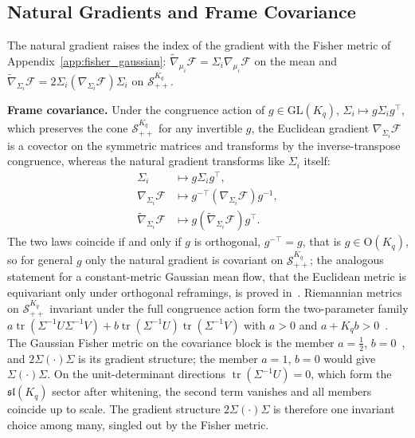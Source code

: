 \subsection*{Natural Gradients and Frame Covariance}

The natural gradient raises the index of the gradient with the Fisher metric of Appendix~\ref{app:fisher_gaussian}: $\tilde{\nabla}_{\mu_i} \mathcal{F} = \Sigma_i \nabla_{\mu_i} \mathcal{F}$ on the mean and $\tilde{\nabla}_{\Sigma_i} \mathcal{F} = 2\Sigma_i (\nabla_{\Sigma_i} \mathcal{F}) \Sigma_i$ on $\mathcal{S}_{++}^{K_q}$.

\textbf{Frame covariance.} Under the congruence action of $g \in \mathrm{GL}(K_q)$, $\Sigma_i \mapsto g\Sigma_i g^\top$, which preserves the cone $\mathcal{S}_{++}^{K_q}$ for any invertible $g$, the Euclidean gradient $\nabla_{\Sigma_i}\mathcal{F}$ is a covector on the symmetric matrices and transforms by the inverse-transpose congruence, whereas the natural gradient transforms like $\Sigma_i$ itself:
\begin{align}
\Sigma_i &\mapsto g\Sigma_i g^\top, \\
\nabla_{\Sigma_i} \mathcal{F} &\mapsto g^{-\top}(\nabla_{\Sigma_i} \mathcal{F})g^{-1}, \\
\tilde{\nabla}_{\Sigma_i} \mathcal{F} &\mapsto g(\tilde{\nabla}_{\Sigma_i} \mathcal{F})g^\top.
\end{align}
The two laws coincide if and only if $g$ is orthogonal, $g^{-\top} = g$, that is $g \in \mathrm{O}(K_q)$, so for general $g$ only the natural gradient is covariant on $\mathcal{S}_{++}^{K_q}$; the analogous statement for a constant-metric Gaussian mean flow, that the Euclidean metric is equivariant only under orthogonal reframings, is proved in~\cite[Ch.~G8]{DennisGaugeVFESuppG2026}. Riemannian metrics on $\mathcal{S}_{++}^{K_q}$ invariant under the full congruence action form the two-parameter family $a\operatorname{tr}(\Sigma^{-1}U\Sigma^{-1}V) + b\operatorname{tr}(\Sigma^{-1}U)\operatorname{tr}(\Sigma^{-1}V)$ with $a > 0$ and $a + K_q b > 0$~\cite{Pennec2009}. The Gaussian Fisher metric on the covariance block is the member $a = \tfrac{1}{2}$, $b = 0$~\cite[Ch.~G5]{DennisGaugeVFESuppG2026}, and $2\Sigma(\cdot)\Sigma$ is its gradient structure; the member $a = 1$, $b = 0$ would give $\Sigma(\cdot)\Sigma$. On the unit-determinant directions $\operatorname{tr}(\Sigma^{-1}U) = 0$, which form the $\mathfrak{sl}(K_q)$ sector after whitening, the second term vanishes and all members coincide up to scale. The gradient structure $2\Sigma(\cdot)\Sigma$ is therefore one invariant choice among many, singled out by the Fisher metric.

